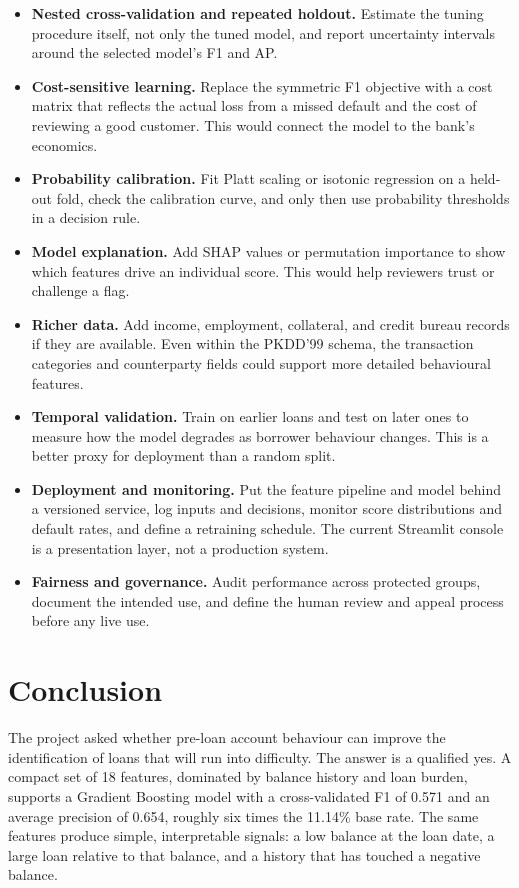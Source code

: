 \begin{itemize}
    \item \textbf{Nested cross-validation and repeated holdout.} Estimate the tuning procedure itself, not only the tuned model, and report uncertainty intervals around the selected model's F1 and AP.
    \item \textbf{Cost-sensitive learning.} Replace the symmetric F1 objective with a cost matrix that reflects the actual loss from a missed default and the cost of reviewing a good customer. This would connect the model to the bank's economics.
    \item \textbf{Probability calibration.} Fit Platt scaling or isotonic regression on a held-out fold, check the calibration curve, and only then use probability thresholds in a decision rule.
    \item \textbf{Model explanation.} Add SHAP values or permutation importance to show which features drive an individual score. This would help reviewers trust or challenge a flag.
    \item \textbf{Richer data.} Add income, employment, collateral, and credit bureau records if they are available. Even within the PKDD'99 schema, the transaction categories and counterparty fields could support more detailed behavioural features.
    \item \textbf{Temporal validation.} Train on earlier loans and test on later ones to measure how the model degrades as borrower behaviour changes. This is a better proxy for deployment than a random split.
    \item \textbf{Deployment and monitoring.} Put the feature pipeline and model behind a versioned service, log inputs and decisions, monitor score distributions and default rates, and define a retraining schedule. The current Streamlit console is a presentation layer, not a production system.
    \item \textbf{Fairness and governance.} Audit performance across protected groups, document the intended use, and define the human review and appeal process before any live use.
\end{itemize}

\section{Conclusion}
\label{sec:conclusion}

The project asked whether pre-loan account behaviour can improve the identification of loans that will run into difficulty. The answer is a qualified yes. A compact set of 18 features, dominated by balance history and loan burden, supports a Gradient Boosting model with a cross-validated F1 of 0.571 and an average precision of 0.654, roughly six times the 11.14\% base rate. The same features produce simple, interpretable signals: a low balance at the loan date, a large loan relative to that balance, and a history that has touched a negative balance.

